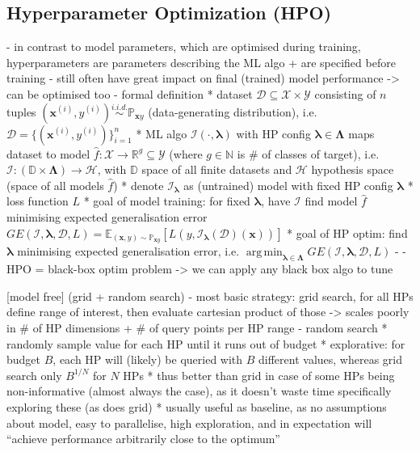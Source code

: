 \documentclass[twoside,11pt]{article}
\DeclareMathOperator*{\argmin}{arg\,min}
\begin{document}
\subsection{Hyperparameter Optimization (HPO)}
- in contrast to model parameters, which are optimised during training, hyperparameters are parameters describing the ML algo + are specified before training
- still often have great impact on final (trained) model performance -> can be optimised too
- formal definition
  * dataset $\mathcal{D}\subseteq\mathcal{X}\times\mathcal{Y}$ consisting of $n$ tuples $(\boldsymbol{x}^{(i)}, y^{(i)})\stackrel{i.i.d.}{\sim}\mathbb{P}_{\boldsymbol{x}y}$
    (data-generating distribution), i.e. $\mathcal{D}=\{(\boldsymbol{x}^{(i)}, y^{(i)})\}_{i=1}^n$
  * ML algo $\mathcal{I}(\cdot,\boldsymbol\lambda)$ with HP config $\boldsymbol\lambda\in\boldsymbol\Lambda$ maps dataset to model
    $\hat{f}:\mathcal{X}\rightarrow\mathbb{R}^g\subseteq\mathcal{Y}$ (where $g\in\mathbb{N}$ is \# of classes of target),
    i.e. $\mathcal{I}:(\mathbb{D}\times\boldsymbol\Lambda)\rightarrow\mathcal{H}$, with $\mathbb{D}$ space of all finite datasets and $\mathcal{H}$ hypothesis space (space of all models $\hat{f}$)
  * denote $\mathcal{I}_{\boldsymbol\lambda}$ as (untrained) model with fixed HP config $\boldsymbol\lambda$
  * loss function $L$
  * goal of model training: for fixed $\boldsymbol\lambda$, have $\mathcal{I}$ find model $\hat{f}$ minimising expected generalisation error
    $GE(\mathcal{I},\boldsymbol\lambda,\mathcal{D},L)=\mathbb{E}_{(\boldsymbol{x},y)\sim\mathbb{P}_{\boldsymbol{x}y}}[L(y,\mathcal{I}_{\boldsymbol\lambda}(\mathcal{D})(\boldsymbol{x}))]$
  * goal of HP optim: find $\boldsymbol\lambda$ minimising expected generalisation error, i.e. $\argmin_{\boldsymbol\lambda\in\boldsymbol\Lambda} GE(\mathcal{I},\boldsymbol\lambda,\mathcal{D},L)$
- \citep[p. 3]{10.1145/3610536}
- HPO = black-box optim problem -> we can apply any black box algo to tune

[model free]
(grid + random search)
- most basic strategy: grid search, for all HPs define range of interest, then evaluate cartesian product of those -> scales poorly in \# of HP dimensions + \# of query points per HP range
- random search
  * randomly sample value for each HP until it runs out of budget
  * explorative: for budget $B$, each HP will (likely) be queried with $B$ different values, whereas grid search only $B^{1/N}$ for $N$ HPs
  * thus better than grid in case of some HPs being non-informative (almost always the case), as it doesn't waste time specifically exploring these (as does grid)
  * usually useful as baseline, as no assumptions about model, easy to parallelise, high exploration, and in expectation will ``achieve performance arbitrarily close to the optimum''
\end{document}
